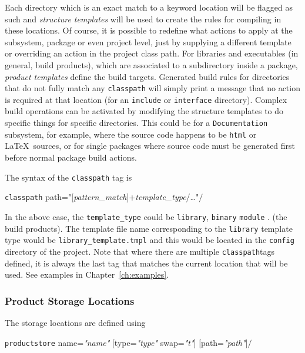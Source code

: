 \ni Each directory which is an exact match to a keyword location will be
flagged as such and \textit{structure templates}
will be used to create the rules for compiling in these locations. 
Of course, it is possible to redefine what actions to apply at the
subsystem, package or even project level, just by supplying a different
template or overriding an action in the project class path.
For libraries and executables (in general, build products), which are 
associated to a subdirectory inside a package, \textit{product
  templates} define the build targets. 
Generated build rules for directories that do not fully match any
\texttt{classpath} will simply print a message that no action is required 
at that location (\eg for an \texttt{include} or \texttt{interface} directory).
Complex build operations can be activated by modifying the
structure templates to do specific things for specific directories.
This could be for a \texttt{Documentation} subsystem, for example,
where the source code happens to be \texttt{html} or \LaTeX\
sources, or for single packages where source code must be generated
first before normal package build actions.

\ni The syntax of the \texttt{classpath} tag is \index{\texttt{classpath}
  tag}%
\begin{tagprint}
  \lbkt\texttt{classpath}
  path="{[}\textit{pattern\_match}{]}+\textit{template\_type}/\ldots"$/$\rbkt
\end{tagprint}

\ni In the above case, the \texttt{template\_type} could be
\texttt{library}, \texttt{binary} \texttt{module} \etc. (the build
products). The template file name corresponding to the
\texttt{library} template type would be
\texttt{library\_template.tmpl} and this would be located in the
\texttt{config} directory of the project.  Note that where there are
multiple \lbkt\texttt{classpath}\rbkt tags defined, it is always the
last tag that matches the current location that will be used.
See examples in Chapter~\ref{ch:examples}.

\subsubsection{Product Storage Locations}
%

The storage locations are defined using
\begin{tagprint}
  \lbkt\texttt{productstore} name=\textit{"name"} {[}type=\textit{"type"}
  swap=\textit{"t"}{]}  {[}path=\textit{"path"}{]}$/$\rbkt
\end{tagprint}

